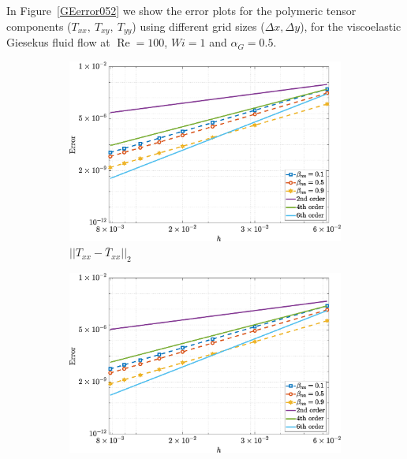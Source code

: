 \documentclass[preprint, 12pt]{elsarticle}
\begin{document}
In Figure~\ref{GEerror052} we show the error plots for the polymeric tensor
components ($T_{xx},~T_{xy},~T_{yy}$) using different grid sizes ($\Delta x,
\Delta y$), for the viscoelastic Giesekus fluid flow at
$\operatorname{Re}=100$, $Wi=1$ and $\alpha_G=0.5$.

\begin{figure}[H]
    \centering  
    \begin{subfigure}[b]{.46\textwidth}
        \includegraphics[width=\textwidth]{NormErr_2nd_Re_100_Wi_1_epsilon_0_xi_0_alphaG_0.5_Dt_1e-06_at_0.05_tipsim_1_MMS_12_Txx.eps}
        \caption{$||T_{xx} - \overline{T}_{xx}||_{2}$}
        \label{error_txx_2nd_Case1_giesekus_alphaG_0.5}
    \end{subfigure}
    \vspace{0.2cm}
    \qquad
    \begin{subfigure}[b]{.46\textwidth}
        \includegraphics[width=\textwidth]{NormErr_2nd_Re_100_Wi_1_epsilon_0_xi_0_alphaG_0.5_Dt_1e-06_at_0.05_tipsim_1_MMS_12_Txy.eps}

\end{subfigure}
\end{figure}
\end{document}

